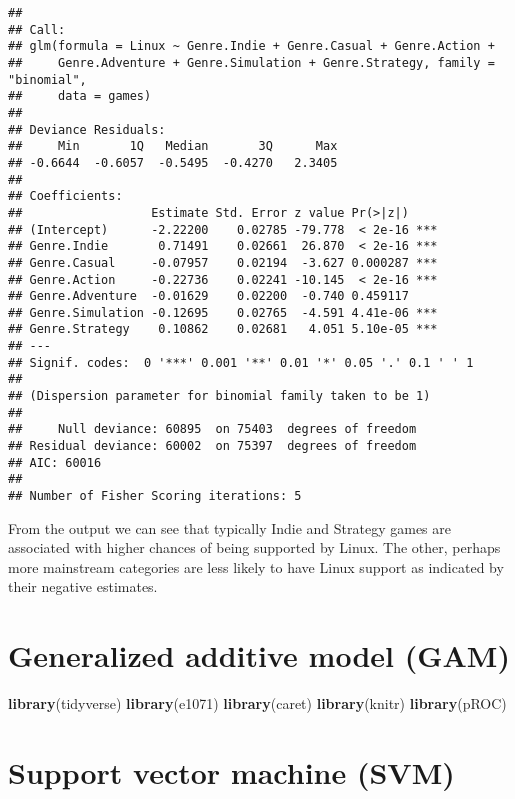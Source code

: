 \documentclass[
]{article}
\newenvironment{Shaded}{\begin{snugshade}}{\end{snugshade}}
\newcommand{\FunctionTok}[1]{\textcolor[rgb]{0.13,0.29,0.53}{\textbf{#1}}}
\newcommand{\NormalTok}[1]{#1}
\begin{document}
\begin{verbatim}
## 
## Call:
## glm(formula = Linux ~ Genre.Indie + Genre.Casual + Genre.Action + 
##     Genre.Adventure + Genre.Simulation + Genre.Strategy, family = "binomial", 
##     data = games)
## 
## Deviance Residuals: 
##     Min       1Q   Median       3Q      Max  
## -0.6644  -0.6057  -0.5495  -0.4270   2.3405  
## 
## Coefficients:
##                  Estimate Std. Error z value Pr(>|z|)    
## (Intercept)      -2.22200    0.02785 -79.778  < 2e-16 ***
## Genre.Indie       0.71491    0.02661  26.870  < 2e-16 ***
## Genre.Casual     -0.07957    0.02194  -3.627 0.000287 ***
## Genre.Action     -0.22736    0.02241 -10.145  < 2e-16 ***
## Genre.Adventure  -0.01629    0.02200  -0.740 0.459117    
## Genre.Simulation -0.12695    0.02765  -4.591 4.41e-06 ***
## Genre.Strategy    0.10862    0.02681   4.051 5.10e-05 ***
## ---
## Signif. codes:  0 '***' 0.001 '**' 0.01 '*' 0.05 '.' 0.1 ' ' 1
## 
## (Dispersion parameter for binomial family taken to be 1)
## 
##     Null deviance: 60895  on 75403  degrees of freedom
## Residual deviance: 60002  on 75397  degrees of freedom
## AIC: 60016
## 
## Number of Fisher Scoring iterations: 5
\end{verbatim}

From the output we can see that typically Indie and Strategy games are
associated with higher chances of being supported by Linux. The other,
perhaps more mainstream categories are less likely to have Linux support
as indicated by their negative estimates.

\hypertarget{generalized-additive-model-gam}{%
\section{Generalized additive model
(GAM)}\label{generalized-additive-model-gam}}

\begin{Shaded}
\begin{Highlighting}[]
\FunctionTok{library}\NormalTok{(tidyverse)}
\FunctionTok{library}\NormalTok{(e1071)}
\FunctionTok{library}\NormalTok{(caret)}
\FunctionTok{library}\NormalTok{(knitr)}
\FunctionTok{library}\NormalTok{(pROC)}
\end{Highlighting}
\end{Shaded}

\hypertarget{support-vector-machine-svm}{%
\section{Support vector machine
(SVM)}\label{support-vector-machine-svm}}
\end{document}
